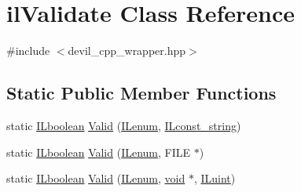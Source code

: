 \hypertarget{classil_validate}{\section{il\-Validate Class Reference}
\label{classil_validate}
}


{\ttfamily \#include $<$devil\-\_\-cpp\-\_\-wrapper.\-hpp$>$}

\subsection*{Static Public Member Functions}
\begin{DoxyCompactItemize}
\item 
static \hyperlink{il_8h_a8be80d75c2c636b9f2250fe10c2e7874}{I\-Lboolean} \hyperlink{classil_validate_a7d9f1c6fa53536ed3fad8b6b6d8cf018}{Valid} (\hyperlink{il_8h_a1542f3a70c0c5370a30a1fa5ce349e2d}{I\-Lenum}, \hyperlink{il_8h_a103ef32cc870d648d471aff6c7076747}{I\-Lconst\-\_\-string})
\item 
static \hyperlink{il_8h_a8be80d75c2c636b9f2250fe10c2e7874}{I\-Lboolean} \hyperlink{classil_validate_aacdfc8f24e08075877606d088a16a6e7}{Valid} (\hyperlink{il_8h_a1542f3a70c0c5370a30a1fa5ce349e2d}{I\-Lenum}, F\-I\-L\-E $\ast$)
\item 
static \hyperlink{il_8h_a8be80d75c2c636b9f2250fe10c2e7874}{I\-Lboolean} \hyperlink{classil_validate_a6d6c633791f51c283066ca9365a8a4cf}{Valid} (\hyperlink{il_8h_a1542f3a70c0c5370a30a1fa5ce349e2d}{I\-Lenum}, \hyperlink{il_8h_a5530e04d947bcddd83639ea7940faf10}{void} $\ast$, \hyperlink{il_8h_ac6508d0e9c19e32f32e00d54b5b8cf30}{I\-Luint})
\end{DoxyCompactItemize}


